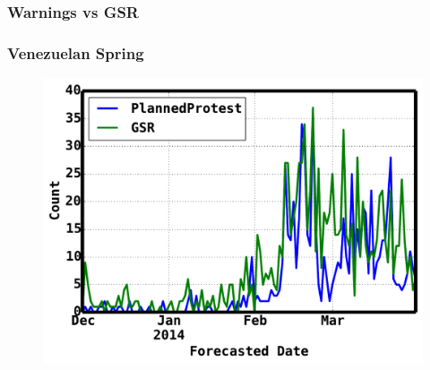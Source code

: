 \documentclass[red,handout]{beamer}
\begin{document}
\begin{frame}
    \frametitle{Warnings vs GSR}
    \begin{figure}%
    \centering
    \qquad
    \end{figure}
\end{frame}

\begin{frame}
     \frametitle{Venezuelan Spring}
     \begin{figure}
        \centering
        \includegraphics[scale=0.4]{venezuela}
     \end{figure}
\end{frame}
\end{document}

